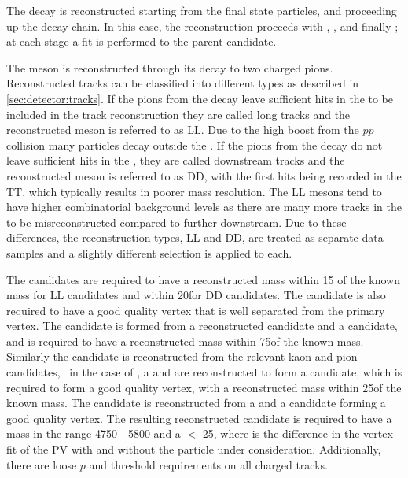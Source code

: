 The decay is reconstructed starting from the final state particles, and proceeding up the decay chain. In this case, the reconstruction proceeds with \decay{\KS}{\pim\pim}, \decay{\Kstarm}{\KS\pim}, \decay{\Dz}{\Km\pip} and finally \decay{\Bm}{\D\Kstarm}; at each stage a fit is performed to the parent candidate.

The \KS meson is reconstructed through its decay to two charged pions. Reconstructed tracks can be classified into different types as described in \sect\ref{sec:detector:tracks}. If the pions from the \KS decay leave sufficient hits in the \velo to be included in the track reconstruction they are called long tracks and the reconstructed \KS meson is referred to as LL. Due to the high boost from the $pp$ collision many \KS particles decay outside the \velo. If the pions from the \KS decay do not leave sufficient hits in the \velo, they are called downstream tracks and the reconstructed \KS meson is referred to as DD, with the first hits being recorded in the TT, which typically results in poorer mass resolution. The LL \KS mesons tend to have higher combinatorial background levels as there are many more tracks in the \velo to be misreconstructed compared to further downstream. Due to these differences, the \KS reconstruction types, LL and DD, are treated as separate data samples and a slightly different selection is applied to each.

The \KS candidates are required to have a reconstructed mass within 15 \mevcc of the known mass for LL \KS candidates and within 20\mevcc for DD \KS candidates. The \KS candidate is also required to have a good quality vertex that is well separated from the primary vertex. The \Kstarm candidate is formed from a reconstructed \KS candidate and a \pim candidate, and is required to have a reconstructed mass within 75\mevcc of the known \Kstarm mass. Similarly the \Dz candidate is reconstructed from the relevant kaon and pion candidates, \eg~in the case of \kpi, a \Km and \pip are reconstructed to form a \Dz candidate, which is required to form a good quality vertex, with a reconstructed mass within 25\mevcc of the known \Dz mass. The \Bm candidate is reconstructed from a \Dz and a \Kstarm candidate forming a good quality vertex. The resulting reconstructed \Bm candidate is required to have a mass in the range 4750 - 5800 \mevcc and a \chisqip $<$ 25, where \chisqip is the difference in the vertex fit \chisq of the PV with and without the particle under consideration. Additionally, there are loose $p$ and \pt threshold requirements on all charged tracks.

